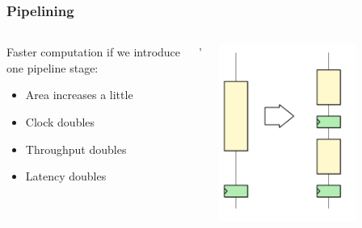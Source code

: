 \documentclass[compress]{beamer}
\begin{document}
\begin{frame}
	\frametitle{Pipelining}
	\begin{columns}
		
		\begin{block}{Faster computation}
			if we introduce one pipeline
			stage:
			\begin{itemize}
				\item Area increases a little
				\item Clock doubles
				\item Throughput doubles
				\item Latency doubles
			\end{itemize}
		\end{block}'
		\begin{center}
			\includegraphics[width=0.7\textwidth]{pipe}
		\end{center}	
	\end{columns}
\end{frame}
\end{document}
